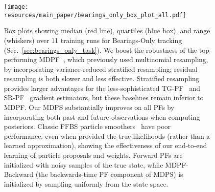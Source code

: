       
        

        \begin{figure}[t]
        \centering
        \texttt{[image: resources/main\_paper/bearings\_only\_box\_plot\_all.pdf]}
        \vskip -0.05in
        \caption{\small{Box plots showing median (red line), quartiles (blue box), and range (whiskers) over 11 training runs for Bearings-Only tracking (Sec.~\ref{sec:bearings_only_task}).  We boost the robustness of the top-performing MDPF~\cite{younis2023mdpf}, which previously used multinomial resampling, by incorporating variance-reduced stratified resampling; residual resampling is both slower and less effective.  Stratified resampling provides larger advantages for the less-sophisticated TG-PF~\cite{jonschkowski18_differentiable_particle_filter} and SR-PF~\cite{pmlr-v87-karkus18a_soft_resampling} gradient estimators, but these baselines remain inferior to MDPF.  
        Our MDPS substantially improves on all PFs by incorporating both past and future observations when computing posteriors. 
        Classic FFBS particle smoothers~\cite{doucet2009tutorial, Klaas2006FastPS} have poor performance, even when provided the true likelihoods (rather than a learned approximation), showing the effectiveness of our end-to-end learning of particle proposals and weights.
        Forward PFs are initialized with noisy samples of the true state, while MDPF-Backward (the backwards-time PF component of MDPS) is initialized by sampling uniformly from the state space.}}
        \label{fig:bearings_only_box_plot_all}
        \vskip -0.1in
    \end{figure}
